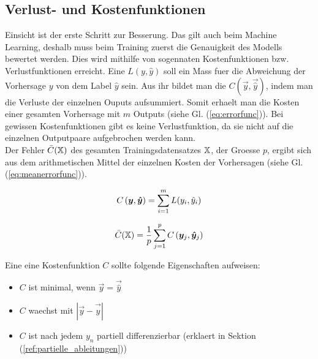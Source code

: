 \subsection{Verlust- und Kostenfunktionen}
Einsicht ist der erste Schritt zur Besserung. Das gilt auch beim Machine Learning, deshalb muss beim Training zuerst die Genauigkeit des Modells bewertet werden.
Dies wird mithilfe von sogennaten Kostenfunktionen bzw. Verlustfunktionen erreicht.
\para{}
Eine  $L(y,\hat{y})$ soll ein Mass fuer die
Abweichung der Vorhersage $y$ von dem Label $\hat{y}$ sein.
Aus ihr bildet man die  $C(\vec{y},\vec{\hat{y}})$, indem man die
Verluste der einzelnen Ouputs aufsummiert. Somit erhaelt man die Kosten
einer gesamten Vorhersage mit $m$ Outputs (siehe Gl. (\ref{eq:errorfunc})). Bei
gewissen Kostenfunktionen gibt es keine Verlustfunktion, da sie nicht auf die
einzelnen Outputpaare aufgebrochen werden kann. \\
Der Fehler $\bar{C}(\mathbb{X})$ des gesamten Trainingsdatensatzes $\mathbb{X}$, der
Groesse $p$, ergibt sich aus dem arithmetischen Mittel der einzelnen Kosten der
Vorhersagen (siehe Gl. (\ref{eq:meanerrorfunc})).
\\
\begin{minipage}[h!]{0.5\textwidth}
  \begin{equation}\label{eq:errorfunc}
    C \left(\bm{y},\bm{\hat{y}} \right) = \displaystyle\sum_{i=1}^{m} L(y_i, \hat{y}_i)
  \end{equation}
\end{minipage}
\begin{minipage}[h!]{0.5\textwidth}
  \begin{equation}\label{eq:meanerrorfunc}
    \bar{C}(\mathbb{X}) = \frac{1}{p}\displaystyle\sum_{j=1}^{p} C\left(\bm{y}_j,\bm{\hat{y}}_j\right)
  \end{equation}
\end{minipage}
\para{}
Eine eine Kostenfunktion $C$ sollte folgende Eigenschaften aufweisen:
\begin{itemize}
\item{$C$ ist minimal, wenn $\vec{y} = \vec{\hat{y}}$}
\item{$C$ waechst mit $|\vec{y} - \vec{\hat{y}}|$}
\item{$C$ ist nach jedem $y_n$ partiell differenzierbar (erklaert in Sektion (\ref{ref:partielle_ableitungen}))}
\end{itemize}
\para{}

\cite{Nielsen}

